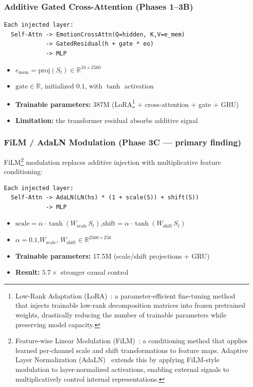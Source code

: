 \documentclass[11pt,a4paper]{article}
\newcommand{\R}{\mathbb{R}}
\newcommand{\St}{S_t}
\begin{document}
\subsubsection*{Additive Gated Cross-Attention (Phases 1--3B)}

\begin{lstlisting}
Each injected layer:
  Self-Attn -> EmotionCrossAttn(Q=hidden, K,V=e_mem)
            -> GatedResidual(h + gate * eo)
            -> MLP
\end{lstlisting}

\begin{itemize}
  \item $e_{\mathrm{mem}} = \mathrm{proj}(\St) \in \R^{16 \times 2560}$
  \item $\mathrm{gate} \in \R$, initialized $0.1$, with $\tanh$ activation
  \item \textbf{Trainable parameters:} 387M (LoRA\footnote{Low-Rank Adaptation (LoRA)~\cite{hu2022lora}: a parameter-efficient fine-tuning method that injects trainable low-rank decomposition matrices into frozen pretrained weights, drastically reducing the number of trainable parameters while preserving model capacity.} + cross-attention + gate + GRU)
  \item \textbf{Limitation:} the transformer residual absorbs additive signal
\end{itemize}

\subsubsection*{FiLM / AdaLN Modulation (Phase 3C --- primary finding)}

FiLM\footnote{Feature-wise Linear Modulation (FiLM)~\cite{perez2018film}: a conditioning method that applies learned per-channel scale and shift transformations to feature maps. Adaptive Layer Normalization (AdaLN)~\cite{ba2016layer} extends this by applying FiLM-style modulation to layer-normalized activations, enabling external signals to multiplicatively control internal representations.} modulation replaces additive injection with multiplicative feature conditioning:

\begin{lstlisting}
Each injected layer:
  Self-Attn -> AdaLN(LN(hs) * (1 + scale(S)) + shift(S))
            -> MLP
\end{lstlisting}

\begin{itemize}
  \item $\mathrm{scale} = \alpha\cdot\tanh(W_{\mathrm{scale}}\,\St)$,\quad $\mathrm{shift} = \alpha\cdot\tanh(W_{\mathrm{shift}}\,\St)$
  \item $\alpha = 0.1$,\quad $W_{\mathrm{scale}},\, W_{\mathrm{shift}} \in \R^{2560 \times 256}$
  \item \textbf{Trainable parameters:} 17.5M (scale/shift projections + GRU)
  \item \textbf{Result:} $5.7\times$ stronger causal control
\end{itemize}
\end{document}
